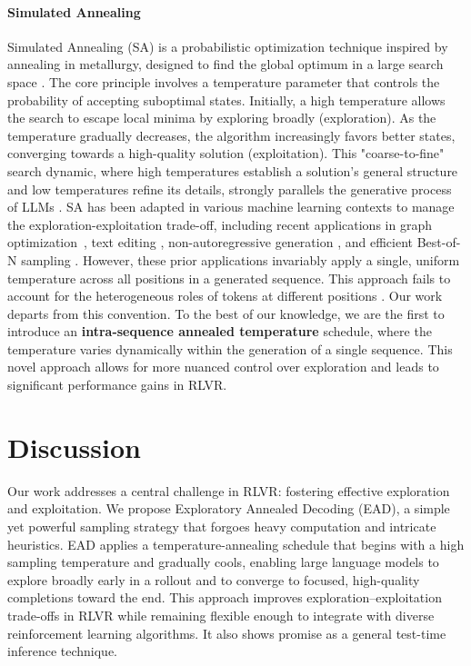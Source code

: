 \documentclass{article} %
\newcommand{\ych}[1]{\textcolor{purple}{[#1 -Chenghao]}}
\begin{document}

\paragraph{Simulated Annealing} 
Simulated Annealing (SA) is a probabilistic optimization technique inspired by annealing in metallurgy, designed to find the global optimum in a large search space \citep{kirkpatrick1983optimization, bertsimas1993simulated}. The core principle involves a temperature parameter that controls the probability of accepting suboptimal states. Initially, a high temperature allows the search to escape local minima by exploring broadly (exploration). As the temperature gradually decreases, the algorithm increasingly favors better states, converging towards a high-quality solution (exploitation).
This "coarse-to-fine" search dynamic, where high temperatures establish a solution's general structure and low temperatures refine its details, strongly parallels the generative process of LLMs \citep{yang2025alignment}. SA has been adapted in various machine learning contexts to manage the exploration-exploitation trade-off, including recent applications in graph optimization~\citep{liu2021simulated}, text editing \citep{zhang2024edt}, non-autoregressive generation \citep{israel2025enabling}, and efficient Best-of-N sampling \citep{manvi2024adaptive}. However, these prior applications invariably apply a single, uniform temperature across all positions in a generated sequence. This approach fails to account for the heterogeneous roles of tokens at different positions \citep{wang2025beyond}. Our work departs from this convention. To the best of our knowledge, we are the first to introduce an \textbf{intra-sequence annealed temperature} schedule, where the temperature varies dynamically within the generation of a single sequence. This novel approach allows for more nuanced control over exploration and leads to significant performance gains in RLVR.

\section{Discussion}
Our work addresses a central challenge in RLVR: fostering effective exploration and exploitation. We propose Exploratory Annealed Decoding (EAD), a simple yet powerful sampling strategy that forgoes heavy computation and intricate heuristics. EAD applies a temperature-annealing schedule that begins with a high sampling temperature and gradually cools, enabling large language models to explore broadly early in a rollout and to converge to focused, high-quality completions toward the end. This approach improves exploration–exploitation trade-offs in RLVR while remaining flexible enough to integrate with diverse reinforcement learning algorithms. It also shows promise as a general test-time inference technique.
\end{document}
